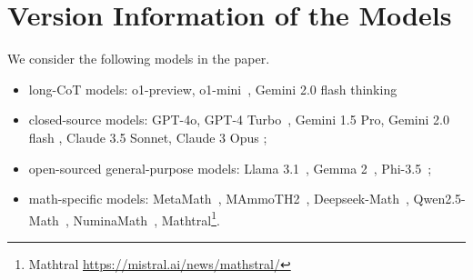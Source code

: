 \section{Version Information of the Models}
\label{appendix:model}

We consider the following models in the paper.
\begin{itemize}[itemsep=1pt, parsep=1pt, topsep=1pt]
    \item long-CoT models: o1-preview, o1-mini~\citep{openaio1}, Gemini 2.0 flash thinking 
    \item closed-source models:  GPT-4o, GPT-4 Turbo~\citep{achiam2023gpt}, Gemini 1.5 Pro, Gemini 2.0 flash \citep{team2024gemini}, Claude 3.5 Sonnet, Claude 3 Opus \citep{claude35};
    \item open-sourced general-purpose models: Llama 3.1~\citep{dubey2024llama}, Gemma 2~\citep{team2024gemma}, Phi-3.5~\citep{abdin2024phi3technicalreporthighly};
    \item math-specific models: MetaMath~\citep{yu2024metamath}, MAmmoTH2~\citep{yue2024mammoth2}, Deepseek-Math~\citep{shao2024deepseekmath}, Qwen2.5-Math~\citep{yang2024qwen25}, NuminaMath~\citep{numina_math_datasets}, Mathtral\footnote{Mathtral \url{https://mistral.ai/news/mathstral/} }.
\end{itemize}

